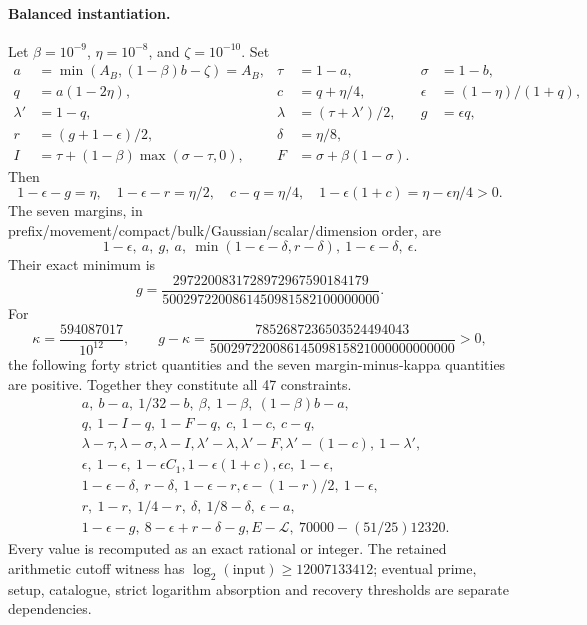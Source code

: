 \documentclass[11pt]{article}
\begin{document}
\paragraph{Balanced instantiation.}
Let $\beta=10^{-9}$, $\eta=10^{-8}$, and $\zeta=10^{-10}$. Set
\begin{align*}
 a&=\min(A_B,(1-\beta)b-\zeta)=A_B,&
 \tau&=1-a,&\sigma&=1-b,\\
 q&=a(1-2\eta),&c&=q+\eta/4,&
 \epsilon&=(1-\eta)/(1+q),\\
 \lambda'&=1-q,&\lambda&=(\tau+\lambda')/2,&
 g&=\epsilon q,\\
 r&=(g+1-\epsilon)/2,&\delta&=\eta/8,\\
 I&=\tau+(1-\beta)\max(\sigma-\tau,0),&
 F&=\sigma+\beta(1-\sigma).
\end{align*}
Then
\[
 1-\epsilon-g=\eta,\quad 1-\epsilon-r=\eta/2,\quad
 c-q=\eta/4,\quad 1-\epsilon(1+c)=\eta-\epsilon\eta/4>0.
\]
The seven margins, in prefix/movement/compact/bulk/Gaussian/scalar/dimension
order, are
\[
 1-\epsilon,\ a,\ g,\ a,\
 \min(1-\epsilon-\delta,r-\delta),\ 1-\epsilon-\delta,\ \epsilon.
\]
Their exact minimum is
\[
 g=\frac{2972200831728972967590184179}{5002972200861450981582100000000}.
\]
For
\[
 \kappa=\frac{594087017}{10^{12}},\qquad
 g-\kappa=\frac{7852687236503524494043}
 {50029722008614509815821000000000000}>0,
\]
the following forty strict quantities and the seven margin-minus-kappa
quantities are positive. Together they constitute all 47 constraints.
\begin{align*}
&a,\ b-a,\ 1/32-b,\ \beta,\ 1-\beta,\ (1-\beta)b-a,\\
&q,\ 1-I-q,\ 1-F-q,\ c,\ 1-c,\ c-q,\\
&\lambda-\tau,\lambda-\sigma,\lambda-I,\lambda'-\lambda,
 \lambda'-F,\lambda'-(1-c),\ 1-\lambda',\\
&\epsilon,\ 1-\epsilon,\ 1-\epsilon C_1,
 1-\epsilon(1+c),\epsilon c,\ 1-\epsilon,\\
&1-\epsilon-\delta,\ r-\delta,\ 1-\epsilon-r,
 \epsilon-(1-r)/2,\ 1-\epsilon,\\
&r,\ 1-r,\ 1/4-r,\ \delta,\ 1/8-\delta,\ \epsilon-a,\\
&1-\epsilon-g,\ 8-\epsilon+r-\delta-g,
 E-\mathcal L,\ 70000-(51/25)12320.
\end{align*}
Every value is recomputed as an exact rational or integer. The retained
arithmetic cutoff witness has $\log_2(\mathrm{input})\ge12007133412$;
eventual prime, setup, catalogue, strict logarithm absorption and recovery
thresholds are separate dependencies.
\end{document}
